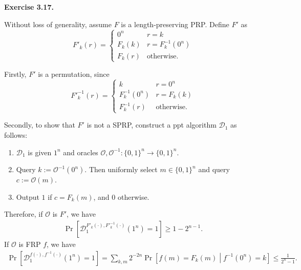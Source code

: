 \documentclass[a4paper]{article}
\newenvironment{exercise}[1]{
	\par
	\noindent\textbf{Exercise #1.}\quad
}{
	\par
	\bigskip
}
\newcommand{\sbra}[1]{\left[ #1 \right]}
\newcommand{\bin}{\{0,1\}}
\newcommand{\ppt}{{\sc ppt} }
\begin{document}
\begin{exercise}{3.17}
    Without loss of generality, assume $F$ is a length-preserving PRP.
    Define $F'$ as
    $$
        F'_k(r)=\begin{cases}
            0^n & r=k\\
            F_k(k) & r=F^{-1}_k(0^n)\\
            F_k(r) & \text{otherwise}.
        \end{cases}
    $$

    Firstly, $F'$ is a permutation, since
    $$
        F'^{-1}_k(r)=\begin{cases}
            k & r=0^n\\
            F^{-1}_k(0^n) & r=F_k(k)\\
            F^{-1}_k(r) & \text{otherwise}.
        \end{cases}
    $$

    Secondly, to show that $F'$ is not a SPRP, construct a \ppt algorithm $\mathcal D_1$ as follows:
    \begin{enumerate}
        \item $\mathcal D_1$ is given $1^n$ and oracles $\mathcal O,\mathcal O^{-1}:\bin^n\to\bin^n$.
        \item Query $k:=\mathcal O^{-1}(0^n)$. Then uniformly select $m\in\bin^n$ and query $c:=\mathcal O(m)$.
        \item Output $1$ if $c=F_k(m)$, and $0$ otherwise.
    \end{enumerate}
    Therefore, if $\mathcal O$ is $F'$, we have
    \begin{align*}
        \Pr\sbra{\mathcal D_1^{F'_k(\cdot),F'^{-1}_k(\cdot)}(1^n)=1}\geq 1-2^{n-1}.
    \end{align*}
    If $\mathcal O$ is FRP $f$, we have
    \begin{align*}
        \Pr\sbra{\mathcal D_1^{f(\cdot),f^{-1}(\cdot)}(1^n)=1}=
        \sum_{k,m}2^{-2n}\Pr\sbra{f(m)=F_k(m)\middle|f^{-1}(0^n)=k}\leq \frac{1}{2^n-1}.
    \end{align*}


\end{exercise}
\end{document}

